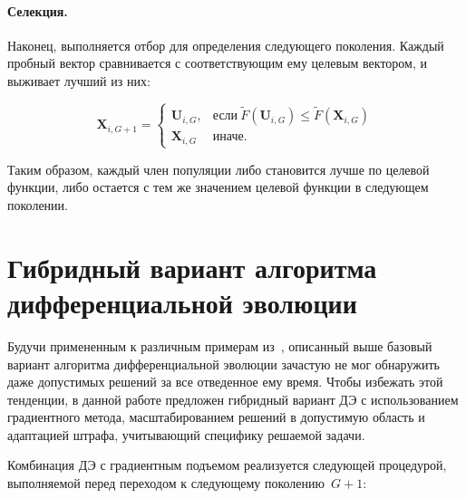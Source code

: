 \paragraph*{Селекция.}

Наконец, выполняется отбор для определения следующего поколения. Каждый пробный вектор сравнивается с соответствующим
ему целевым вектором, и выживает лучший из них:

\begin{equation}\label{eq:de_sel}
  \textbf{X}_{i,G+1} =
  \begin{cases}
    \textbf{U}_{i,G}, & \mbox{если} \ \tilde{F}(\textbf{U}_{i,G}) \leq \tilde{F}(\textbf{X}_{i,G}) \\
    \textbf{X}_{i,G} & \mbox{иначе}.
  \end{cases}
\end{equation}

Таким образом, каждый член популяции либо становится лучше по целевой функции, либо остается с тем же значением
целевой функции в следующем поколении.

\section{Гибридный вариант алгоритма дифференциальной эволюции}
Будучи примененным к различным примерам из~\cite{tyu:daor}, описанный выше базовый вариант алгоритма
дифференциальной эволюции зачастую не мог обнаружить даже допустимых решений за все отведенное ему время.
Чтобы избежать этой тенденции, в данной работе предложен гибридный вариант ДЭ с использованием градиентного метода,
масштабированием решений в допустимую область и адаптацией штрафа, учитывающий специфику решаемой задачи.

Комбинация ДЭ с градиентным подъемом реализуется следующей процедурой, выполняемой перед переходом к следующему поколению~$G+1$:

